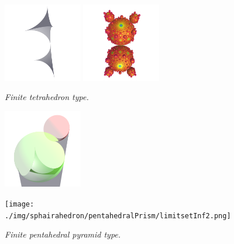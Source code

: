 \documentclass[dvipdfmx]{interact}
\theoremstyle{plain}%
\theoremstyle{definition}
\theoremstyle{remark}
\theoremstyle{problemstyle}
\begin{document}
\begin{figure}[H]
 \begin{minipage}{0.5\textwidth}
  \begin{minipage}[t]{0.24\textwidth}
   \centering
   \includegraphics[width=1.35in, height=1.35in, keepaspectratio]{./img/sphairahedron/pentahedralPrism/sphairahedronFinite2.png}
  \end{minipage}
  \hspace*{\fill}
  \begin{minipage}[t]{0.24\textwidth}
   \centering
   \includegraphics[width=1.35in, height=1.35in, keepaspectratio]{./img/sphairahedron/pentahedralPrism/limitsetFinite2.png}
  \end{minipage}
  \hspace*{\fill}
  \caption{\textit{Finite tetrahedron type.}}
  \label{fig:pentahedralPrismFinite}
 \end{minipage}
 \hspace*{\fill}
 \begin{minipage}{0.5\textwidth}
  \begin{minipage}[t]{0.24\textwidth}
   \centering
   \includegraphics[width=1.35in, height=1.35in, keepaspectratio]{./img/sphairahedron/pentahedralPrism/sphairahedronInf2.png}
  \end{minipage}
  \hspace*{\fill}
  \begin{minipage}[t]{0.24\textwidth}
   \centering
   \texttt{[image: ./img/sphairahedron/pentahedralPrism/limitsetInf2.png]}
  \end{minipage}
  \hspace*{\fill}
  \caption{\textit{Finite pentahedral pyramid type.}}
  \label{fig:pentahedralPrismInf}
 \end{minipage}
\end{figure}
\end{document}
